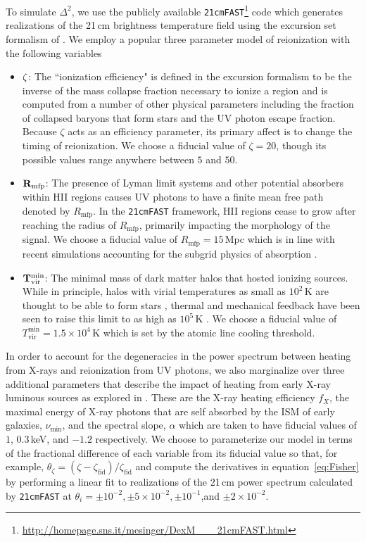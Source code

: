 \documentclass[twocolumn]{emulateapj}
\begin{document}
To simulate $\Delta^2$, we use the publicly available {\tt 21cmFAST}\footnote{\url{http://homepage.sns.it/mesinger/DexM___21cmFAST.html}} code \citep{Mesinger:2011} which generates realizations of the 21\,cm brightness temperature field using the excursion set formalism of \citet{Furlanetto:2004}. We employ a popular three parameter model of reionization \citep{Mesinger:2012} with the following variables 
\begin{itemize}
\item ${\bf \zeta}$: The ``ionization efficiency" is defined in the \citet{Furlanetto:2004} excursion formalism to be the inverse of the mass collapse fraction necessary to ionize a region and is computed from a number of other physical parameters including the fraction of collapsed baryons that form stars and the UV photon escape fraction. Because $\zeta$ acts as an efficiency parameter, its primary affect is to change the timing of reionization. We choose a fiducial value of $\zeta=20$, though its possible values range anywhere between $5$ and $50$. 
\item ${\bf R_\text{mfp}}$: The presence of Lyman limit systems and other potential absorbers within HII regions causes UV photons to have a finite mean free path denoted by $R_\text{mfp}$. In the {\tt 21cmFAST} framework, HII regions cease to grow after reaching the radius of $R_\text{mfp}$, primarily impacting the morphology of the signal. We choose a fiducial value of $R_\text{mfp}=15$\,Mpc which is in line with recent simulations accounting for the subgrid physics of absorption \citep{Sobacchi:2014}. 
\item ${\bf T_\text{vir}^\text{min}}$: The minimal mass of dark matter halos that hosted ionizing sources. While in principle, halos with virial temperatures as small as $10^2$\,K are thought to be able to form stars \citep{Haiman:1996a,Tegmark:1997c}, thermal and mechanical feedback have been seen to raise this limit to as high as $10^5$\,K \citep{Springel:2003,Mesinger:2008,Okamoto:2008}. We choose a fiducial value of $T_\text{vir}^\text{min} = 1.5\times 10^4$\,K which is set by the atomic line cooling threshold. 
\end{itemize}
In order to account for the degeneracies in the power spectrum between heating from X-rays and reionization from UV photons, we also marginalize over three additional parameters that describe the impact of heating from early X-ray luminous sources as explored in \citep{EwallWice:2015b}. These are the X-ray heating efficiency $f_X$, the maximal energy of X-ray photons that are self absorbed by the ISM of early galaxies, $\nu_\text{min}$, and the spectral slope, $\alpha$ which are taken to have fiducial values of $1$, $0.3$\,keV, and $-1.2$ respectively. We choose to parameterize our model in terms of the fractional difference of each variable from its fiducial value so that, for example, $\theta_\zeta = (\zeta - \zeta_\text{fid})/\zeta_\text{fid}$ and compute the derivatives in equation~\ref{eq:Fisher} by performing a linear fit to realizations of the 21\,cm power spectrum calculated by {\tt 21cmFAST} at $\theta_i= \pm 10^{-2}, \pm 5\times 10^{-2}, \pm 10^{-1}$,and $ \pm 2 \times 10^{-2}$. 
\end{document}
